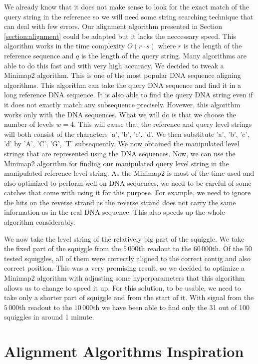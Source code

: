We already know that it does not make sense to look for the exact match of the query string in the reference
so we will need some string searching technique that can deal with few errors.
Our alignment algorithm presented in Section \ref{section:alignment} could be adapted but it lacks the neccessary speed. This
algorithm works in the time complexity $O(r\cdot s)$ where $r$ is the length of the
reference sequence and $q$ is the length of the query string. Many algorithms are able
to do this fast and with very high accuracy. We decided to tweak a Minimap2 \cite{li2018minimap2} algorithm. This is
one of the most popular DNA sequence aligning algorithms. This algorithm can take the
query DNA sequence and find it in a long reference DNA sequence. It is also able to
find the query DNA string even if it does not exactly match any subsequence precisely.
Hovewer, this algorithm works only with the DNA sequences. What we will do is that we choose
the number of levels $w=4$. This will cause that the reference and query level strings will both consist of
the characters 'a', 'b', 'c', 'd'. We then substitute 'a', 'b', 'c', 'd' by
'A', 'C', 'G', 'T' subsequently. We now obtained the manipulated level strings that
are represented using the DNA sequences. Now, we can use the Minimap2 algorithm for
finding our manipulated query level string in the manipulated reference level string.
As the Minimap2 is most of the time used and also optimized to perform well on DNA
sequences, we need to be careful of some catches that come with using it for this
purpose. For example, we need to ignore the hits on the reverse strand as the
reverse strand does not carry the same information as in the real DNA sequence.
This also speeds up the whole algorithm considerably.

We now take the level string of the relatively big part of the squiggle. We take the
fixed part of the squiggle from the $5\,000$th readout to the $60\,000$th. Of the 50
tested squiggles, all of them were correctly aligned to the correct contig and also
correct position. This was a very promising result, so we decided to optimize a
Minimap2 algorithm with adjusting some hyperparameters that this algorithm allows us
to change to speed it up. For this solution, to be usable, we need to take only
a shorter part of squiggle and from the start of it. With signal from the $5\,000$th
readout to the $10\,000$th we have been able to find only the 31 out of 100 squiggles
in around 1 minute.

\section{Alignment Algorithms Inspiration}

